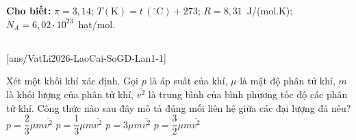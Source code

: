 
	\noindent\textbf{Cho biết:} $\pi=3{,}14$; $T(\text{K})=t\,(^\circ\text{C})+273$; $R=8{,}31$~J/(mol.K); $N_A=6{,}02\cdot 10^{23}$~hạt/mol.

	\noindent
	\subsection*{}
	\setcounter{ex}{0}
	[ans/VatLi2026-LaoCai-SoGD-Lan1-1]

	\begin{ex}%
		Xét một khối khí xác định. Gọi $p$ là áp suất của khí, $\mu$ là mật độ phân tử khí, $m$ là khối lượng của phân tử khí, $\overline{v^2}$ là trung bình của bình phương tốc độ các phân tử khí. Công thức nào sau đây mô tả đúng mối liên hệ giữa các đại lượng đã nêu?
		\choice
		{$p=\dfrac{2}{3}\mu m\overline{v^2}$}
		{\True $p=\dfrac{1}{3}\mu m\overline{v^2}$}
		{$p=3\mu m\overline{v^2}$}
		{$p=\dfrac{3}{2}\mu m\overline{v^2}$}
	\end{ex}

